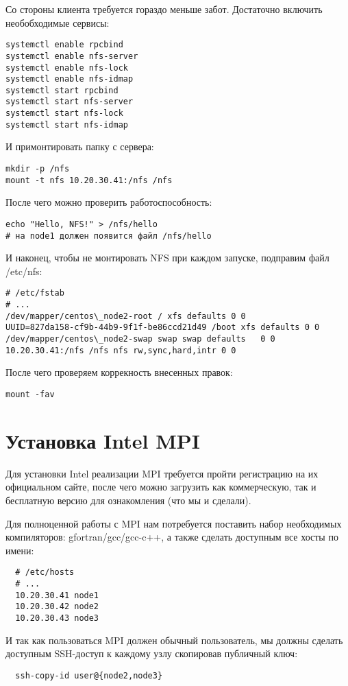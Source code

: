 Со стороны клиента требуется гораздо меньше забот. Достаточно
включить необобходимые сервисы:
\begin{verbatim}
systemctl enable rpcbind
systemctl enable nfs-server
systemctl enable nfs-lock
systemctl enable nfs-idmap
systemctl start rpcbind
systemctl start nfs-server
systemctl start nfs-lock
systemctl start nfs-idmap
\end{verbatim}
И примонтировать папку с сервера:
\begin{verbatim}
mkdir -p /nfs
mount -t nfs 10.20.30.41:/nfs /nfs
\end{verbatim}
После чего можно проверить работоспособность:
\begin{verbatim}
echo "Hello, NFS!" > /nfs/hello
# на node1 должен появится файл /nfs/hello
\end{verbatim}
И наконец, чтобы не монтировать NFS при каждом запуске,
подправим файл \textmd{/etc/nfs}:
\begin{verbatim}
# /etc/fstab
# ...
/dev/mapper/centos\_node2-root / xfs defaults 0 0
UUID=827da158-cf9b-44b9-9f1f-be86ccd21d49 /boot xfs defaults 0 0
/dev/mapper/centos\_node2-swap swap swap defaults   0 0
10.20.30.41:/nfs /nfs nfs rw,sync,hard,intr 0 0
\end{verbatim}
После чего проверяем коррекность внесенных правок: 
\begin{verbatim}
mount -fav
\end{verbatim}

\section{Установка Intel MPI}

Для установки Intel реализации MPI требуется пройти
регистрацию на их официальном сайте\cite{intel-mpi}, после
чего можно загрузить как коммерческую, так и бесплатную версию
для ознакомления (что мы и сделали).

Для полноценной работы с MPI нам потребуется поставить набор 
необходимых компиляторов: gfortran/gcc/gcc-c++, а также
сделать доступным все хосты по имени:
\begin{verbatim}
  # /etc/hosts
  # ...
  10.20.30.41 node1
  10.20.30.42 node2
  10.20.30.43 node3
\end{verbatim}

И так как пользоваться MPI должен обычный пользователь, мы
должны сделать доступным SSH-доступ к каждому узлу скопировав
публичный ключ:
\begin{verbatim}
  ssh-copy-id user@{node2,node3}
\end{verbatim}

